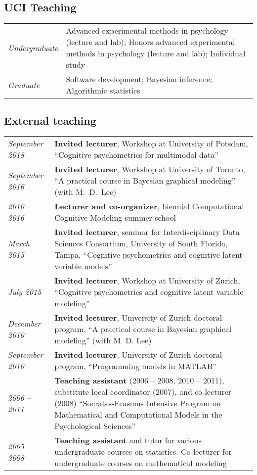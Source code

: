 \documentclass[]{article}
\def\slist{\begin{longtable}{>{\em}p{1.25in} p{5.0in}}}
\def\elist{\end{longtable}}
\renewcommand{\textbf}[1]{{\bf\color{Bordeaux}#1}}
\begin{document}
\subsection*{UCI Teaching}
\slist
Undergraduate & Advanced experimental methods in psychology 
                (lecture and lab);
               Honors advanced experimental methods in 
                psychology (lecture and lab);
               Individual study
               \\
Graduate      & Software development;
               Bayesian inference;
               Algorithmic statistics
\elist

\subsection*{External teaching}
\slist
September 2018 & \textbf{Invited lecturer}, Workshop at University of
			     Potsdam, ``Cognitive psychometrics for multimodal data''\\
September 2016 & \textbf{Invited lecturer}, Workshop at University of
			     Toronto, ``A practical course in Bayesian
                 graphical modeling'' (with M.~D.~Lee)\\
2010 -- 2016   & \textbf{Lecturer and co-organizer}, biennial 
			     Computational Cognitive Modeling summer school\\
March 2015     & \textbf{Invited lecturer}, seminar for Interdisciplinary
			     Data Sciences Consortium, University of South
                 Florida, Tampa, ``Cognitive psychometrics and
                 cognitive latent variable models''\\
July 2015      & \textbf{Invited lecturer}, Workshop at University of
			     Zurich, ``Cognitive psychometrics and cognitive
                 latent variable modeling''\\
December 2010  & \textbf{Invited lecturer}, University of Zurich doctoral
			 	 program, ``A practical course in Bayesian
                 graphical modeling'' (with M. D. Lee)\\
September 2010 & \textbf{Invited lecturer}, University of Zurich doctoral
				 program, ``Programming models in MATLAB''\\
2006 -- 2011   & \textbf{Teaching assistant} (2006 -- 2008, 2010 -- 2011),
				 substitute local coordinator (2007), and 
                 co-lecturer (2008) ``Socrates-Erasmus Intensive
                 Program on Mathematical and Computational Models in
                 the Psychological Sciences''\\
2005 -- 2008   & \textbf{Teaching assistant} and tutor for various
				 undergraduate courses on statistics. Co-lecturer
                 for undergraduate courses on mathematical modeling
\elist
\end{document}
